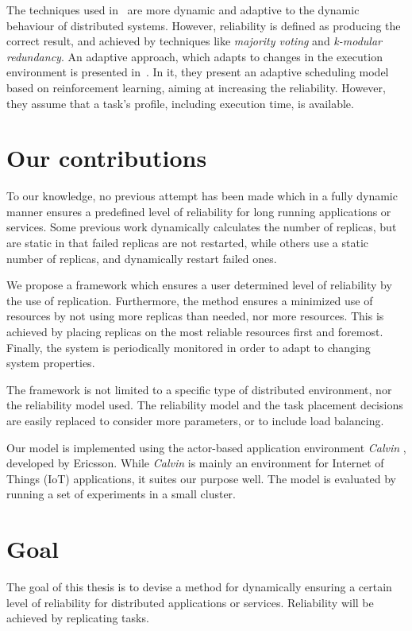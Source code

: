\documentclass{cslthse-msc}
\begin{document}
The techniques used in~\cite{selfAdaptRel, dynAdaptRepl, relModelWebServices} are more dynamic and adaptive to the dynamic behaviour of distributed systems. However, reliability is defined as producing the correct result, and achieved by techniques like \emph{majority voting} and \emph{k-modular redundancy}. An adaptive approach, which adapts to changes in the execution environment is presented in~\cite{imprRelAdaptRL}. In it, they present an adaptive scheduling model based on reinforcement learning, aiming at increasing the reliability. However, they assume that a task's profile, including execution time, is available.

\section{Our contributions} \label{sec:introduction_contributions}
To our knowledge, no previous attempt has been made which in a fully dynamic manner ensures a predefined level of reliability for long running applications or services. Some previous work dynamically calculates the number of replicas, but are static in that failed replicas are not restarted, while others use a static number of replicas, and dynamically restart failed ones.

We propose a framework which ensures a user determined level of reliability by the use of replication. Furthermore, the method ensures a minimized use of resources by not using more replicas than needed, nor more resources. This is achieved by placing replicas on the most reliable resources first and foremost. Finally, the system is periodically monitored in order to adapt to changing system properties.

The framework is not limited to a specific type of distributed environment, nor the reliability model used. The reliability model and the task placement decisions are easily replaced to consider more parameters, or to include load balancing. 

Our model is implemented using the actor-based application environment \emph{Calvin} \cite{calvin}, developed by Ericsson. While \emph{Calvin} is mainly an environment for Internet of Things (IoT) applications, it suites our purpose well. The model is evaluated by running a set of experiments in a small cluster.

\section{Goal} \label{sec:introduction_goals}
The goal of this thesis is to devise a method for dynamically ensuring a certain level of reliability for distributed applications or services. Reliability will be achieved by replicating tasks.
\end{document}
